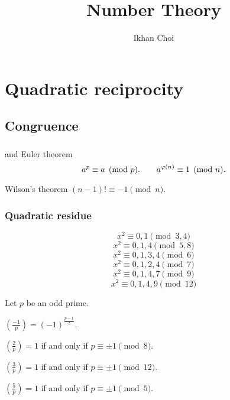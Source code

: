 \documentclass{../../large}
\begin{document}
\title{Number Theory}
\author{Ikhan Choi}
\maketitle
\tableofcontents

\part{Quadratic reciprocity}

\chapter{Congruence}

\section{}

\begin{prb}
	
\end{prb}


\begin{prb}
and Euler theorem
\[a^p\equiv a\pmod p.\qquad a^{\varphi(n)}\equiv1\pmod n.\]
\end{prb}

Wilson's theorem $(n-1)!\equiv-1\pmod n$.


\section{Quadratic residue}

\begin{prb}
\[x^2\equiv0,1\pmod{3,4}\]
\[x^2\equiv0,1,4\pmod{5,8}\]
\[x^2\equiv0,1,3,4\pmod{6}\]
\[x^2\equiv0,1,2,4\pmod{7}\]
\[x^2\equiv0,1,4,7\pmod{9}\]
\[x^2\equiv0,1,4,9\pmod{12}\]
\end{prb}

\begin{prb}
Let $p$ be an odd prime.
\begin{parts}
\item $\left(\frac{-1}p\right)=(-1)^{\frac{p-1}2}$.
\item $\left(\frac2p\right)=1$ if and only if $p\equiv\pm1\pmod8$.
\item $\left(\frac3p\right)=1$ if and only if $p\equiv\pm1\pmod{12}$.
\item $\left(\frac5p\right)=1$ if and only if $p\equiv\pm1\pmod5.$
\end{parts}
\end{prb}
\end{document}
